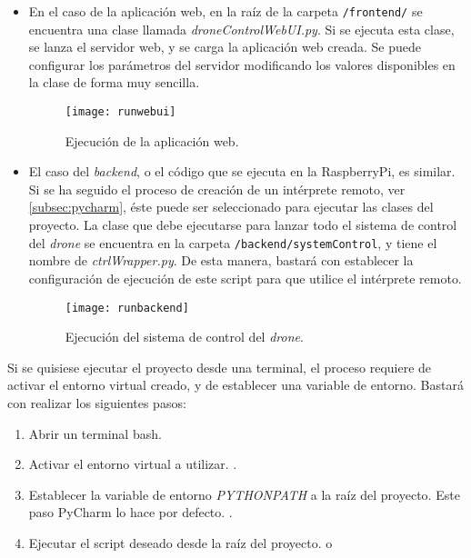 \begin{itemize}
\item En el caso de la aplicación web, en la raíz de la carpeta \texttt{/frontend/} se encuentra una clase llamada \emph{droneControlWebUI.py}. Si se ejecuta esta clase, se lanza el servidor web, y se carga la aplicación web creada. Se puede configurar los parámetros del servidor modificando los valores disponibles en la clase de forma muy sencilla.
\begin{figure}[H]
	\centering
	\texttt{[image: runwebui]}
	\caption[Ejecución de aplicación web]{Ejecución de la aplicación web.}\label{fig:runwebui}
\end{figure}

\item El caso del \emph{backend}, o el código que se ejecuta en la RaspberryPi, es similar. Si se ha seguido el proceso de creación de un intérprete remoto, ver \ref{subsec:pycharm}, éste puede ser seleccionado para ejecutar las clases del proyecto. La clase que debe ejecutarse para lanzar todo el sistema de control del \emph{drone} se encuentra en la carpeta \texttt{/backend/systemControl}, y tiene el nombre de \emph{ctrlWrapper.py}. De esta manera, bastará con establecer la configuración de ejecución de este script para que utilice el intérprete remoto.

\begin{figure}[H]
	\centering
	\texttt{[image: runbackend]}
	\caption[Ejecución del sistema de control]{Ejecución del sistema de control del \emph{drone}.}\label{fig:runbackend}
\end{figure}
\end{itemize}

Si se quisiese ejecutar el proyecto desde una terminal, el proceso requiere de activar el entorno virtual creado, y de establecer una variable de entorno. Bastará con realizar los siguientes pasos:

\begin{enumerate}
\item Abrir un terminal bash.
\item Activar el entorno virtual a utilizar. .
\item Establecer la variable de entorno \emph{PYTHONPATH} a la raíz del proyecto. Este paso PyCharm lo hace por defecto. .
\item Ejecutar el script deseado desde la raíz del proyecto.  o 
\end{enumerate}

